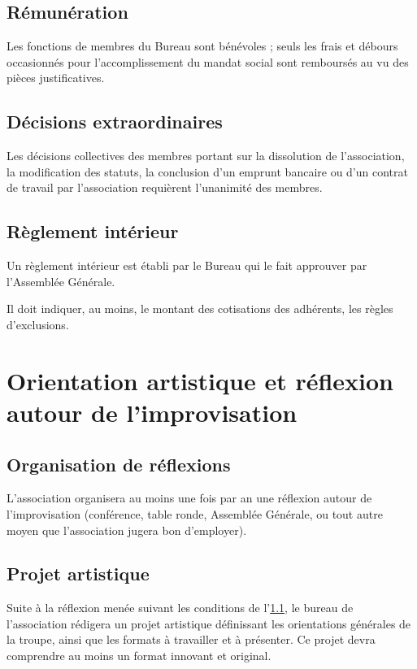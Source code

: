 \documentclass[a4paper,french,10pt]{article}
\begin{document}
\subsection{Rémunération}
\label{sec:remuneration}
Les fonctions de membres du Bureau sont bénévoles ; seuls les frais et
débours occasionnés pour l’accomplissement du mandat social sont
remboursés au vu des pièces justificatives.

\subsection{Décisions extraordinaires}
\label{sec:decisions-extra}
Les décisions collectives des membres portant sur la dissolution de
l’association, la modification des statuts, la conclusion d’un emprunt
bancaire ou d’un contrat de travail par l’association requièrent
l’unanimité des membres.

\subsection{Règlement intérieur}
\label{sec:reglement}
Un règlement intérieur est établi par le Bureau qui le fait approuver
par l’Assemblée Générale.

Il doit indiquer, au moins, le montant des cotisations des adhérents, les règles d'exclusions.


\section{Orientation artistique et réflexion autour de
  l'improvisation}

\subsection{Organisation de réflexions}
\label{sec:reflexions}
L'association organisera au moins une fois par an une réflexion autour
de l'improvisation (conférence, table ronde, Assemblée Générale, ou
tout autre moyen que l'association jugera bon d'employer).


\subsection{Projet artistique}
\label{sec:projet}
Suite à la réflexion menée suivant les conditions de l'\ref{sec:reflexions}, le
bureau de l'association rédigera un projet artistique définissant les
orientations générales de la troupe, ainsi que les formats à
travailler et à présenter. Ce projet devra comprendre au moins un
format innovant et original.
\end{document}
